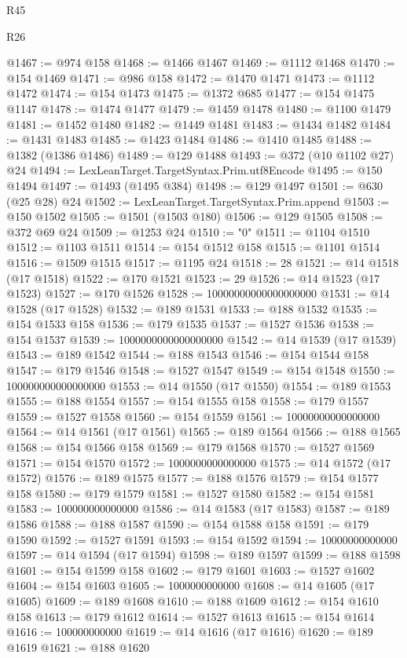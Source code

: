 \begin{lexlean}{R45}
\begin{lexlean}{R26}
\begin{coremodule}
{{{{{{{{{{{{{{{{{{{{{{{{{{{{{{{{{{{{{{{{{{{{{{{{{{{{{{{{{{{{{{{{{{{{{{{{@1467 := @974 @158
@1468 := @1466 @1467
@1469 := @1112 @1468
@1470 := @154 @1469
@1471 := @986 @158
@1472 := @1470 @1471
@1473 := @1112 @1472
@1474 := @154 @1473
@1475 := @1372 @685
@1477 := @154 @1475 @1147
@1478 := @1474 @1477
@1479 := @1459 @1478
@1480 := @1100 @1479
@1481 := @1452 @1480
@1482 := @1449 @1481
@1483 := @1434 @1482
@1484 := @1431 @1483
@1485 := @1423 @1484
@1486 := @1410 @1485
@1488 := @1382 (@1386 @1486)
@1489 := @129 @1488
@1493 := @372 (@10 @1102 @27) @24
@1494 := LexLeanTarget.TargetSyntax.Prim.utf8Encode
@1495 := @150 @1494
@1497 := @1493 (@1495 @384)
@1498 := @129 @1497
@1501 := @630 (@25 @28) @24
@1502 := LexLeanTarget.TargetSyntax.Prim.append
@1503 := @150 @1502
@1505 := @1501 (@1503 @180)
@1506 := @129 @1505
@1508 := @372 @69 @24
@1509 := @1253 @24
@1510 := "0"
@1511 := @1104 @1510
@1512 := @1103 @1511
@1514 := @154 @1512 @158
@1515 := @1101 @1514
@1516 := @1509 @1515
@1517 := @1195 @24
@1518 := 28
@1521 := @14 @1518 (@17 @1518)
@1522 := @170 @1521
@1523 := 29
@1526 := @14 @1523 (@17 @1523)
@1527 := @170 @1526
@1528 := 10000000000000000000
@1531 := @14 @1528 (@17 @1528)
@1532 := @189 @1531
@1533 := @188 @1532
@1535 := @154 @1533 @158
@1536 := @179 @1535
@1537 := @1527 @1536
@1538 := @154 @1537
@1539 := 1000000000000000000
@1542 := @14 @1539 (@17 @1539)
@1543 := @189 @1542
@1544 := @188 @1543
@1546 := @154 @1544 @158
@1547 := @179 @1546
@1548 := @1527 @1547
@1549 := @154 @1548
@1550 := 100000000000000000
@1553 := @14 @1550 (@17 @1550)
@1554 := @189 @1553
@1555 := @188 @1554
@1557 := @154 @1555 @158
@1558 := @179 @1557
@1559 := @1527 @1558
@1560 := @154 @1559
@1561 := 10000000000000000
@1564 := @14 @1561 (@17 @1561)
@1565 := @189 @1564
@1566 := @188 @1565
@1568 := @154 @1566 @158
@1569 := @179 @1568
@1570 := @1527 @1569
@1571 := @154 @1570
@1572 := 1000000000000000
@1575 := @14 @1572 (@17 @1572)
@1576 := @189 @1575
@1577 := @188 @1576
@1579 := @154 @1577 @158
@1580 := @179 @1579
@1581 := @1527 @1580
@1582 := @154 @1581
@1583 := 100000000000000
@1586 := @14 @1583 (@17 @1583)
@1587 := @189 @1586
@1588 := @188 @1587
@1590 := @154 @1588 @158
@1591 := @179 @1590
@1592 := @1527 @1591
@1593 := @154 @1592
@1594 := 10000000000000
@1597 := @14 @1594 (@17 @1594)
@1598 := @189 @1597
@1599 := @188 @1598
@1601 := @154 @1599 @158
@1602 := @179 @1601
@1603 := @1527 @1602
@1604 := @154 @1603
@1605 := 1000000000000
@1608 := @14 @1605 (@17 @1605)
@1609 := @189 @1608
@1610 := @188 @1609
@1612 := @154 @1610 @158
@1613 := @179 @1612
@1614 := @1527 @1613
@1615 := @154 @1614
@1616 := 100000000000
@1619 := @14 @1616 (@17 @1616)
@1620 := @189 @1619
@1621 := @188 @1620
}}}}}}}}}}}}}}}}}}}}}}}}}}}}}}}}}}}}}}}}}}}}}}}}}}}}}}}}}}}}}}}}}}}}}}}}
\end{coremodule}
\end{lexlean}
\end{lexlean}

